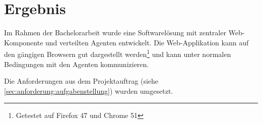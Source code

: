 \begin{comment}
Ergebnisse der Arbeit: was wurde erreicht, was wurde nicht erreicht, Ursachen.
Dieser Abschnitt richtet sich an den speziell für das entsprechende Fachgebiet
interessierten Ingenieur. Er soll es ihm ermöglichen, die für die Problemlösung
gemachten Überlegungen zu verstehen und nachzuvollziehen. Theoretische
Grundlagen sind nur so weit auszuarbeiten, als dies für die Lösung der Aufgabe
nötig ist (keine Lehrbücher schreiben). Die Erkenntnisse aus den theoretischen
Untersuchungen sind wenn immer möglich direkt mit der Problemlösung zu
verknüpfen.

Schlussfolgerungen, Bewertung der Ergebnisse.
Die Schlussfolgerungen bilden zusammen mit der Zusammenfassung die
wichtigsten Abschnitte eines Berichts und sollen daher am sorgfältigsten
ausgearbeitet sein. Die Schlussfolgerungen enthalten eine Zusammenfassung
und Beurteilung der Resultate (Vergleich mit anderen Lösungen, was wurde
erreicht, was nicht, was bleibt noch zu tun, was würde man nun anders tun). In
den Schlussfolgerungen soll auch ein Ausblick auf das weitere Vorgehen bzw.
auf die Bedeutung der erreichten Ergebnisse gegeben werden.

Installationsanleitung vorhanden (inklusive verwendete Entwicklungsumgebung und Werkzeuge), Test-Logs dokumentiert (bei Systemen mit User Interfaces: Dokumentation der Usability Tests)

Ideen für Schlussfolgerung:
* fehlendes Know-How?
* Positives
* negatives
* Vor-/Nachteile Rails? Was wenn ohne Rails gemacht?
\end{comment}

\chapter{Ergebnis}

Im Rahmen der Bachelorarbeit wurde eine Softwarelösung mit zentraler Web-Komponente und verteilten Agenten entwickelt. Die Web-Applikation kann auf den gängigen Browsern gut dargestellt werden\footnote{Getestet auf Firefox 47 und Chrome 51} und kann unter normalen Bedingungen mit den Agenten kommunizieren.

Die Anforderungen aus dem Projektauftrag (siehe \ref{sec:anforderung:aufgabenstellung}) wurden umgesetzt.

